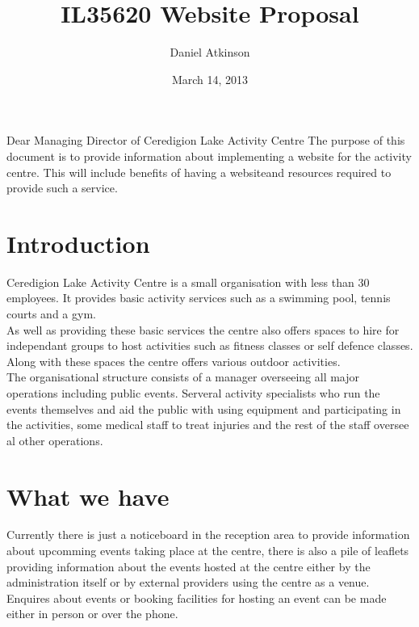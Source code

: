 \documentclass{article}
\begin{document}
\title{IL35620 Website Proposal}

\author{Daniel Atkinson}
\date{March 14, 2013}
\maketitle


\tableofcontents
\newpage
Dear Managing Director of Ceredigion Lake Activity Centre
The purpose of this document is to provide information about implementing a website for the activity centre.  This will include benefits of having a websiteand resources required to provide such a service.

\section{Introduction}
Ceredigion Lake Activity Centre is a small organisation with less than 30 employees.  It provides basic activity services such as a swimming pool, tennis courts and a gym.
\\As well as providing these basic services the centre also offers spaces to hire for independant groups to host activities such as fitness classes or self defence classes.  Along with these spaces the centre offers various outdoor activities.
\\The organisational structure consists of a manager overseeing all major operations including public events.  Serveral activity specialists who run the events themselves and aid the public with using equipment and participating in the activities, some medical staff to treat injuries and the rest of the staff oversee al other operations.
\section{What we have}
Currently there is just a noticeboard in the reception area to provide information about upcomming events taking place at the centre, there is also a pile of leaflets providing information about the events hosted at the centre either by the administration itself or by external providers using the centre as a venue.
\\Enquires about events or booking facilities for hosting an event can be made either in person or over the phone.
\end{document}
